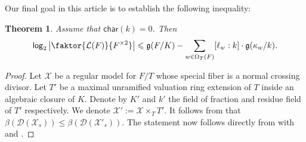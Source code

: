 \documentclass[a4paper,12pt,reqno]{amsart}
\newcommand\mc\mathcal
\newtheorem{thm}{Theorem}[section]
\theoremstyle{definition}
\numberwithin{equation}{thm}
\renewcommand{\leq}{\leqslant}
\renewcommand{\log}{\mathsf{log}}
\begin{document}
Our final goal in this article is to establish  the following inequality:

\begin{thm}\label{boundlocal}
Assume that $\mathsf{char}(k)=0$. Then
$$\log_2\left|\faktor{\mathcal{L}(F)}{F^{\times 2}}\right|\leq \mathfrak{g}(F/K) - \sum_{w \in \Omega_T(F)} [\ell_w:k]\cdot \mathfrak{g}(\kappa_w/k).$$
\end{thm}
\begin{proof}
Let $\mc{X}$ be a regular model for $F/T$ whose special fiber is a normal crossing divisor. Let $T'$ be a maximal unramified valuation ring extension of $T$ inside an algebraic closure of $K$. Denote by $K'$ and $k'$ the  field of fraction and residue field of $T'$ respectively. We denote 
$\mc{X}':= \mc{X} \times_T T'$. It follows from  that $\beta(\mc{D}(\mc{X}_s))\leq \beta(\mc{D}(\mc{X'}_s)).$
The statement now follows directly from  with  and . 
\end{proof}
\end{document}
